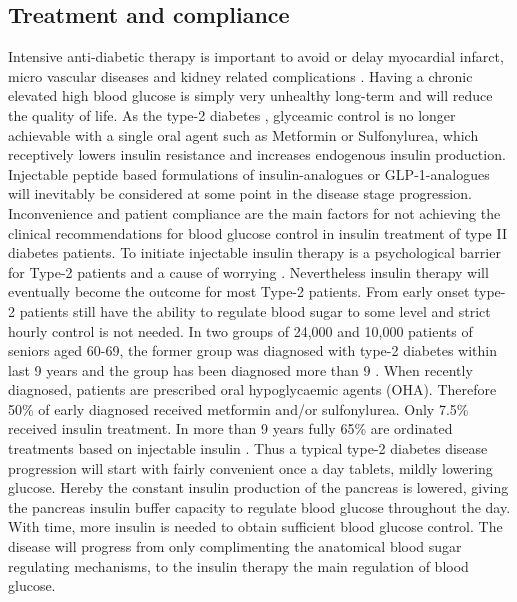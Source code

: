 \subsection{Treatment and compliance}
Intensive anti-diabetic therapy is important to avoid or delay myocardial infarct, micro vascular diseases and kidney related complications \cite{holman,boussageon2011effect,gaede2008effect}. Having a chronic elevated high blood glucose \DIFaddbegin {}\DIFaddend is simply very unhealthy long-term and will reduce the quality of life. As the type-2 diabetes \DIFdelbegin {}\DIFdelend \DIFaddbegin {}\DIFaddend , glyceamic control is no longer achievable with a single oral agent such as Metformin or Sulfonylurea, which receptively lowers insulin resistance and increases endogenous insulin production. Injectable peptide based formulations of insulin-analogues or GLP-1-analogues will inevitably be considered at some point in the disease stage progression. Inconvenience and patient compliance are the main factors for not achieving the clinical recommendations for blood glucose control in insulin treatment of type II diabetes patients. To initiate injectable insulin therapy is a psychological barrier for Type-2 patients and a cause of worrying \cite{korytkowski2002oral}. Nevertheless insulin therapy will eventually become the outcome for most Type-2 patients. From early onset type-2 patients still have the ability to regulate blood sugar to some level and strict hourly control is not needed. In two groups \DIFdelbegin {}\DIFdelend of 24,000 and 10,000 patients of seniors aged 60-69\DIFdelbegin {}\DIFdelend , the former group was diagnosed with type-2 diabetes within last 9 years and the \DIFdelbegin {}\DIFdelend \DIFaddbegin {}\DIFaddend group has been diagnosed \DIFdelbegin {}\DIFdelend more than 9 \DIFdelbegin {}\DIFdelend \DIFaddbegin {}\DIFaddend . When recently diagnosed, patients are prescribed oral hypoglycaemic agents (OHA). Therefore 50\% of early diagnosed \DIFaddbegin {}\DIFaddend received metformin and/or sulfonylurea. Only 7.5\% received insulin treatment. In \DIFdelbegin {}\DIFdelend \DIFaddbegin {}\DIFaddend more than 9 years \DIFaddbegin {}\DIFaddend fully 65\% are ordinated treatments based on injectable insulin \cite{Elbert2014rates}. Thus a typical type-2 diabetes disease progression will start with fairly convenient once a day tablets, mildly lowering glucose. Hereby the constant insulin production of the pancreas is lowered, giving the pancreas \DIFaddbegin {}\DIFaddend insulin buffer capacity to regulate blood glucose throughout the day. With time, more insulin is needed to obtain sufficient blood glucose control. The disease will progress from \DIFdelbegin {}\DIFdelend \DIFaddbegin {}\DIFaddend only complimenting the anatomical blood sugar regulating mechanisms, to \DIFdelbegin {}\DIFdelend the insulin therapy \DIFdelbegin {}\DIFdelend \DIFaddbegin {}\DIFaddend the main regulation of blood glucose.

